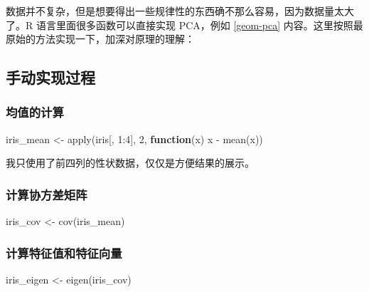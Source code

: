 \documentclass[
]{krantz}
\makeatletter
\newenvironment{Shaded}{\begin{snugshade}}{\end{snugshade}}
\newcommand{\ControlFlowTok}[1]{\textcolor[rgb]{0.13,0.29,0.53}{\textbf{#1}}}
\newcommand{\DecValTok}[1]{\textcolor[rgb]{0.00,0.00,0.81}{#1}}
\newcommand{\FunctionTok}[1]{\textcolor[rgb]{0.00,0.00,0.00}{#1}}
\newcommand{\NormalTok}[1]{#1}
\newcommand{\OtherTok}[1]{\textcolor[rgb]{0.56,0.35,0.01}{#1}}
\newcommand{\SpecialCharTok}[1]{\textcolor[rgb]{0.00,0.00,0.00}{#1}}
\newenvironment{kframe}{%
\medskip{}
\setlength{\fboxsep}{.8em}
 \def\at@end@of@kframe{}%
 \ifinner\ifhmode%
  \def\at@end@of@kframe{\end{minipage}}%
  \begin{minipage}{\columnwidth}%
 \fi\fi%
 \def\FrameCommand##1{\hskip\@totalleftmargin \hskip-\fboxsep
 \colorbox{shadecolor}{##1}\hskip-\fboxsep
     \hskip-\linewidth \hskip-\@totalleftmargin \hskip\columnwidth}%
 \MakeFramed {\advance\hsize-\width
   \@totalleftmargin\z@ \linewidth\hsize
   \@setminipage}}%
 {\par\unskip\endMakeFramed%
 \at@end@of@kframe}
\renewenvironment{Shaded}{\begin{kframe}}{\end{kframe}}
\makeatother
\begin{document}
数据并不复杂，但是想要得出一些规律性的东西确不那么容易，因为数据量太大了。R 语言里面很多函数可以直接实现 PCA，例如 \ref{geom-pca} 内容。这里按照最原始的方法实现一下，加深对原理的理解：

\hypertarget{man_pca}{%
\subsection{手动实现过程}\label{man_pca}}

\hypertarget{av_val}{%
\subsubsection{均值的计算}\label{av_val}}

\begin{Shaded}
\begin{Highlighting}[]
\NormalTok{iris\_mean }\OtherTok{\textless{}{-}} \FunctionTok{apply}\NormalTok{(iris[, }\DecValTok{1}\SpecialCharTok{:}\DecValTok{4}\NormalTok{], }\DecValTok{2}\NormalTok{, }\ControlFlowTok{function}\NormalTok{(x) x }\SpecialCharTok{{-}} \FunctionTok{mean}\NormalTok{(x))}
\end{Highlighting}
\end{Shaded}

我只使用了前四列的性状数据，仅仅是方便结果的展示。

\hypertarget{cov_val}{%
\subsubsection{计算协方差矩阵}\label{cov_val}}

\begin{Shaded}
\begin{Highlighting}[]
\NormalTok{iris\_cov }\OtherTok{\textless{}{-}} \FunctionTok{cov}\NormalTok{(iris\_mean)}
\end{Highlighting}
\end{Shaded}

\hypertarget{eig_val}{%
\subsubsection{计算特征值和特征向量}\label{eig_val}}

\begin{Shaded}
\begin{Highlighting}[]
\NormalTok{iris\_eigen }\OtherTok{\textless{}{-}} \FunctionTok{eigen}\NormalTok{(iris\_cov)}
\end{Highlighting}
\end{Shaded}
\end{document}
